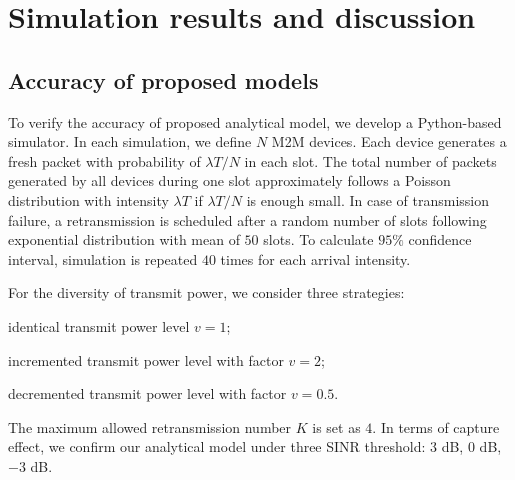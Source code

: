 \section{Simulation results and discussion}
\label{sec:simulation_result}
%
\subsection{Accuracy of proposed models}
To verify the accuracy of proposed analytical model, we develop a Python-based simulator. In each simulation, we define $N$ M2M devices. Each device generates a fresh packet with probability of $\lambda T/N$ in each slot. The total number of packets generated by all devices during one slot approximately follows a Poisson distribution with intensity $\lambda T$ if $\lambda T/N$ is enough small. In case of transmission failure, a retransmission is scheduled after a random number of slots following exponential distribution with mean of $50$ slots. To calculate $95\%$ confidence interval, simulation is repeated $40$ times for each arrival intensity.

For the diversity of transmit power, we consider three strategies: \begin{inparaenum}[1)]
	\item identical transmit power level $v=1$; 
	\item incremented transmit power level with factor $v=2$;
	\item decremented transmit power level with factor $v=0.5$.
\end{inparaenum}
The maximum allowed retransmission number $K$ is set as $4$. In terms of capture effect, we confirm our analytical model under three SINR threshold: $3$ dB, $0$ dB, $-3$ dB.  

